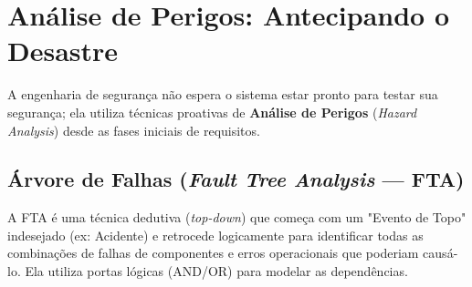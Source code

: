 \documentclass[12pt,a4paper,twoside]{report}
\begin{document}
\section{Análise de Perigos: Antecipando o Desastre}

A engenharia de segurança não espera o sistema estar pronto para testar sua segurança; ela utiliza técnicas proativas de \textbf{Análise de Perigos} (\emph{Hazard Analysis}) desde as fases iniciais de requisitos.

\subsection{Árvore de Falhas (\textit{Fault Tree Analysis} — FTA)}

A FTA é uma técnica dedutiva (\emph{top-down}) que começa com um "Evento de Topo" indesejado (ex: Acidente) e retrocede logicamente para identificar todas as combinações de falhas de componentes e erros operacionais que poderiam causá-lo. Ela utiliza portas lógicas (AND/OR) para modelar as dependências.
\end{document}
